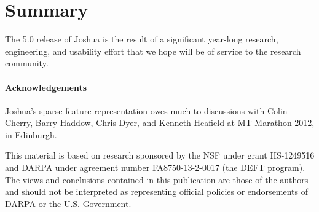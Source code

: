 \documentclass[11pt]{article}
\begin{document}
\section{Summary}

The 5.0 release of Joshua is the result of a significant year-long
research, engineering, and usability effort that we hope will be of
service to the research community. 

\paragraph{Acknowledgements}

Joshua's sparse feature representation owes much to discussions with
Colin Cherry, Barry Haddow, Chris Dyer, and Kenneth Heafield at MT
Marathon 2012, in Edinburgh.

This material is based on research sponsored by the NSF under grant
IIS-1249516 and DARPA under agreement number FA8750-13-2-0017 (the
DEFT program). The views and conclusions contained in this publication
are those of the authors and should not be interpreted as representing
official policies or endorsements of DARPA or the U.S. Government.




\end{document}

